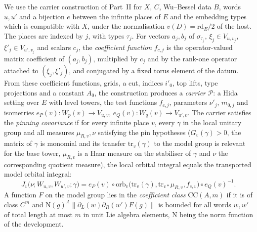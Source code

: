 We use the carrier construction of Part~II for $X$, $C$, Wu--Bessel data $B$, words $u,u'$ and a bijection $e$ between the
infinite places of $E$ and the embedding types which is compatible with $X$, under the normalisation $v(D)=\mathrm{rd}_E/2$ of
the host. The places are indexed by $j$, with types $\tau_j$. For vectors $a_j,b_j$ of $\sigma_{\tau_j}$,
$\xi_j\in V_{u,v_j}$, $\xi'_j\in V_{u',v_j}$ and scalars $c_j$, the \emph{coefficient function} $f_{c,j}$ is the
operator-valued matrix coefficient of $(a_j,b_j)$, multiplied by $c_j$ and by the rank-one operator attached to
$(\xi_j,\xi'_j)$, and conjugated by a fixed torus element of the datum. From these coefficient functions, grids, a cut, indices
$i'_0$, top lifts, type projections and a constant $A_0$, the construction produces a \emph{carrier} $\mathcal P$: a Hida setting
over $E$ with level towers, the test functions $f_{c,j}$, parameters $\nu'_j$, $m_{0,j}$ and isometries
$e_P(v)\colon W_p(v)\to V_{u,v}$, $e_Q(v)\colon W_q(v)\to V_{u',v}$. The carrier satisfies the \emph{pinning covariance} if for
every infinite place $v$, every $\gamma$ in the local unitary group and all measures $\mu_{R,v},\nu$ satisfying the pin hypotheses
($G_v(\gamma)>0$, the matrix of $\gamma$ is monomial and its transfer $\mathrm{tr}_v(\gamma)$ to the model group is relevant for
the base tower, $\mu_{R,v}$ is a Haar measure on the stabiliser of $\gamma$ and $\nu$ the corresponding quotient measure), the
local orbital integral equals the transported model orbital integral:
\[
J_v\bigl(\nu;W_{u,v},W_{u',v};\gamma\bigr)=e_P(v)\circ\mathrm{orb}_v\bigl(\mathrm{tr}_v(\gamma),\mathrm{tr}_{v*}\mu_{R,v},f_{c,v}\bigr)\circ
e_Q(v)^{-1}.
\]
A function $F$ on the model group lies in the \emph{coefficient class} $\mathrm{CC}(A,m)$ if it is of class $C^m$ and
$\mathrm N(g)^A\|\partial_L(w)\partial_R(w')F(g)\|$ is bounded for all words $w,w'$ of total length at most $m$ in unit Lie algebra
elements, $\mathrm N$ being the norm function of the development.

